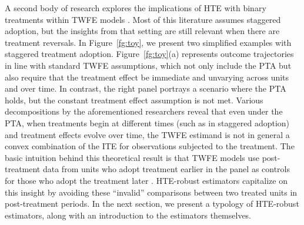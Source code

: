 \documentclass[12pt]{article}
\begin{document}
A second body of research explores the implications of HTE with binary treatments within TWFE models \citep[e.g.,][]{Goodman-Bacon2021-xb, CDH2020, Strezhnev2018-ku, callaway2021-did, BJS2021,Athey2018-re}. Most of this literature assumes staggered adoption, but the insights from that setting are still relevant when there are treatment reversals. In Figure~\ref{fg:toy}, we present two simplified examples with staggered treatment adoption. Figure~\ref{fg:toy}(a) represents outcome trajectories in line with standard TWFE assumptions, which not only include the PTA but also require that the treatment effect be immediate and unvarying across units and over time. In contrast, the right panel portrays a scenario where the PTA holds, but the constant treatment effect assumption is not met. Various decompositions by the aforementioned researchers reveal that even under the PTA, when treatments begin at different times (such as in staggered adoption) and treatment effects evolve over time, the TWFE estimand is not in general a convex combination of the ITE for observations subjected to the treatment. The basic intuition behind this theoretical result is that TWFE models use post-treatment data from units who adopt treatment earlier in the panel as controls for those who adopt the treatment later \citep[e.g.,][]{Goodman-Bacon2021-xb}. HTE-robust estimators capitalize on this insight by avoiding these ``invalid'' comparisons between two treated units in post-treatment periods. In the next section, we present a typology of HTE-robust estimators, along with an introduction to the estimators themselves.
\end{document}
